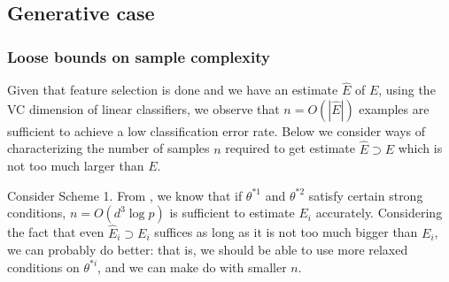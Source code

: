 \documentclass{article}
\def\edge{\ensuremath{E}}
\def\edgeEst{\hat{E}}
\begin{document}
\subsection{Generative case}
\subsubsection{Loose bounds on sample complexity}
Given that feature selection is done and we have an estimate $\edgeEst$ of \edge, using the VC dimension of linear classifiers, we observe that $n = O(|\edgeEst|)$ examples are sufficient to achieve a low classification error rate. Below we consider ways of characterizing the number of samples $n$ required to get estimate $\edgeEst \supset \edge$ which is not too much larger than \edge.

Consider Scheme 1. From \cite{RWLIsing}, we know that if $\theta^{*1}$ and $\theta^{*2}$ satisfy certain strong conditions, $n = O(d^{3}\log p)$ is sufficient to estimate $\edge_i$ accurately. Considering the fact that even $\edgeEst_i \supset \edge_i$ suffices as long as it is not too much bigger than $\edge_i$, we can probably do better: that is, we should be able to use more relaxed conditions on $\theta^{*i}$, and we can make do with smaller $n$.
\end{document}
